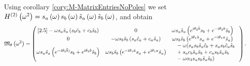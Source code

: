 Using corollary \ref{cory:M-MatrixEntriesNoPoles} we set $H^{(2)}\left( \omega^2 \right) = s_a\left( \omega \right) s_b\left( \omega \right) \tilde{s}_a\left( \omega \right) \tilde{s}_b\left( \omega \right)$, and obtain
\begin{align*}
	\mathfrak{M}_{\theta}\left( \omega^2 \right) &=
	\begin{pmatrix}[2.5]
		-\omega s_a \tilde{s}_a \left(  s_b \tilde{c}_b + c_b \tilde{s}_b  \right) &
		0 &
		\begin{split}
			&\omega s_a \tilde{s}_a \left(  e^{\mathrm{i}\theta_2\tilde{b}}s_b + e^{-\mathrm{i}\theta_2 b}\tilde{s}_b  \right)
		\end{split} \\
		0 &
		-\omega s_b \tilde{s}_b \left(  s_a \tilde{c}_a + c_a \tilde{s}_a  \right) &
		\begin{split}
			&\omega s_b \tilde{s}_b \left(  e^{\mathrm{i}\theta_1\tilde{a}}s_a + e^{-\mathrm{i}\theta_1 a}\tilde{s}_a  \right) 
		\end{split} \\
		\omega s_a \tilde{s}_a \left(  e^{-\mathrm{i}\theta_2\tilde{b})}s_b + e^{\mathrm{i}\theta_2 b}\tilde{s}_b  \right) &
		\omega s_b \tilde{s}_b \left(  e^{-\mathrm{i}\theta_1\tilde{a}}s_a + e^{\mathrm{i}\theta_1 a}\tilde{s}_a  \right) &
		\begin{split}
			&-\omega ( s_a s_b \tilde{s}_a \tilde{c}_b 
			+ s_a s_b \tilde{c}_a \tilde{s}_b \\ 
			& + s_a c_b \tilde{s}_a \tilde{s}_b
			+ c_a s_b \tilde{s}_a \tilde{s}_b \\
			& - \omega\alpha_3 s_a s_b \tilde{s}_a \tilde{s}_b )
		\end{split}
	\end{pmatrix}.
\end{align*}

